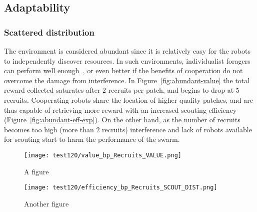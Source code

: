 \documentclass[runningheads]{llncs}
\begin{document}
\subsection{Adaptability}
\label{subsec:adaptability}

\subsubsection{Scattered distribution}

The environment is considered abundant since it is relatively easy for the robots to independently discover resources. In such environments, individualist foragers can perform well enough~\cite{pitonakova_icr_2018,wilson_sociobiology_2000}, or even better if the benefits of cooperation do not overcome the damage from interference. In Figure~\ref{fig:abundant-value} the total reward collected saturates after $2$ recruits per patch, and begins to drop at $5$ recruits. Cooperating robots share the location of higher quality patches, and are thus capable of retrieving more reward with an increased scouting efficiency (Figure~\ref{fig:abundant-eff-exp}). On the other hand, as the number of recruits becomes too high (more than $2$ recruits) interference and lack of robots available for scouting start to harm the performance of the swarm.

\begin{figure}
\centering
\begin{minipage}{.495\textwidth}
  \centering
  \texttt{[image: test120/value\_bp\_Recruits\_VALUE.png]}
  \caption{A figure}
  \label{fig:scattered-value}
\end{minipage}
\centering
\begin{minipage}{.495\textwidth}
  \centering
  \texttt{[image: test120/efficiency\_bp\_Recruits\_SCOUT\_DIST.png]}
  \caption{Another figure}
  \label{fig:scattered-eff-exp}
\end{minipage}
\end{figure}

\end{document}
